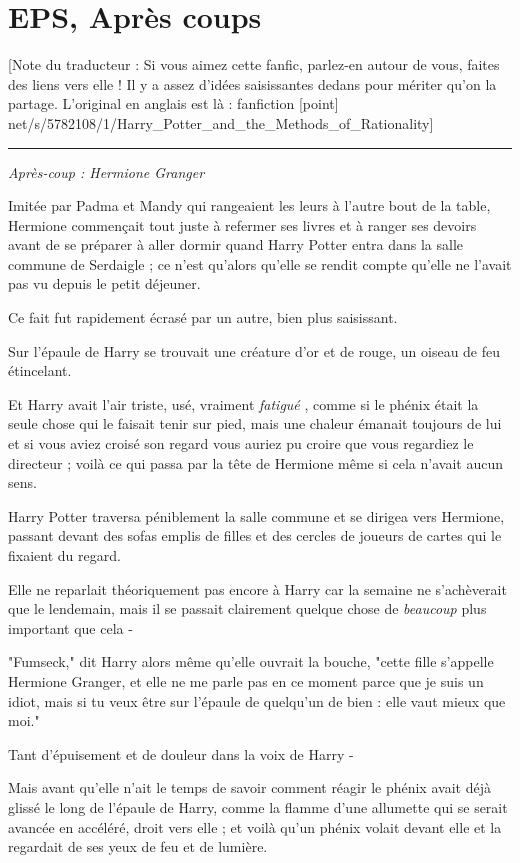 
\chapter{EPS, Après coups}

[Note du traducteur : Si vous aimez cette fanfic, parlez-en autour de vous, faites des liens vers elle ! Il y a assez d'idées saisissantes dedans pour mériter qu'on la partage. L'original en anglais est là : fanfiction [point] net/s/5782108/1/Harry\_Potter\_and\_the\_Methods\_of\_Rationality]
\par\noindent\rule{\textwidth}{0.4pt}
\emph{Après-coup : Hermione Granger} 

Imitée par Padma et Mandy qui rangeaient les leurs à l'autre bout de la table, Hermione commençait tout juste à refermer ses livres et à ranger ses devoirs avant de se préparer à aller dormir quand Harry Potter entra dans la salle commune de Serdaigle ; ce n'est qu'alors qu'elle se rendit compte qu'elle ne l'avait pas vu depuis le petit déjeuner.

Ce fait fut rapidement écrasé par un autre, bien plus saisissant.

Sur l'épaule de Harry se trouvait une créature d'or et de rouge, un oiseau de feu étincelant.

Et Harry avait l'air triste, usé, vraiment \emph{fatigué} , comme si le phénix était la seule chose qui le faisait tenir sur pied, mais une chaleur émanait toujours de lui et si vous aviez croisé son regard vous auriez pu croire que vous regardiez le directeur ; voilà ce qui passa par la tête de Hermione même si cela n'avait aucun sens.

Harry Potter traversa péniblement la salle commune et se dirigea vers Hermione, passant devant des sofas emplis de filles et des cercles de joueurs de cartes qui le fixaient du regard.

Elle ne reparlait théoriquement pas encore à Harry car la semaine ne s'achèverait que le lendemain, mais il se passait clairement quelque chose de \emph{beaucoup}  plus important que cela -

"Fumseck," dit Harry alors même qu'elle ouvrait la bouche, "cette fille s'appelle Hermione Granger, et elle ne me parle pas en ce moment parce que je suis un idiot, mais si tu veux être sur l'épaule de quelqu'un de bien : elle vaut mieux que moi."

Tant d'épuisement et de douleur dans la voix de Harry -

Mais avant qu'elle n'ait le temps de savoir comment réagir le phénix avait déjà glissé le long de l'épaule de Harry, comme la flamme d'une allumette qui se serait avancée en accéléré, droit vers elle ; et voilà qu'un phénix volait devant elle et la regardait de ses yeux de feu et de lumière.

